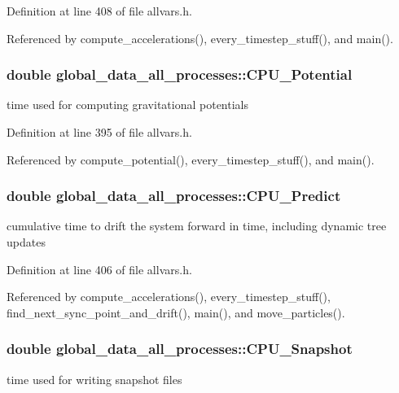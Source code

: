 Definition at line 408 of file allvars.h.



Referenced by compute\_\-accelerations(), every\_\-timestep\_\-stuff(), and main().

\hypertarget{structglobal__data__all__processes_ab5f1e056cdaa2562ec2bd3945f634d73}{
\subsubsection[{CPU\_\-Potential}]{\setlength{\rightskip}{0pt plus 5cm}double {\bf global\_\-data\_\-all\_\-processes::CPU\_\-Potential}}}
\label{structglobal__data__all__processes_ab5f1e056cdaa2562ec2bd3945f634d73}
time used for computing gravitational potentials 

Definition at line 395 of file allvars.h.



Referenced by compute\_\-potential(), every\_\-timestep\_\-stuff(), and main().

\hypertarget{structglobal__data__all__processes_afb9d30620ea0dc8b9e46000e3ce0b3e3}{
\subsubsection[{CPU\_\-Predict}]{\setlength{\rightskip}{0pt plus 5cm}double {\bf global\_\-data\_\-all\_\-processes::CPU\_\-Predict}}}
\label{structglobal__data__all__processes_afb9d30620ea0dc8b9e46000e3ce0b3e3}
cumulative time to drift the system forward in time, including dynamic tree updates 

Definition at line 406 of file allvars.h.



Referenced by compute\_\-accelerations(), every\_\-timestep\_\-stuff(), find\_\-next\_\-sync\_\-point\_\-and\_\-drift(), main(), and move\_\-particles().

\hypertarget{structglobal__data__all__processes_a4b533ec2fc1af7ee057eaa5805a65a7a}{
\subsubsection[{CPU\_\-Snapshot}]{\setlength{\rightskip}{0pt plus 5cm}double {\bf global\_\-data\_\-all\_\-processes::CPU\_\-Snapshot}}}
\label{structglobal__data__all__processes_a4b533ec2fc1af7ee057eaa5805a65a7a}
time used for writing snapshot files 

